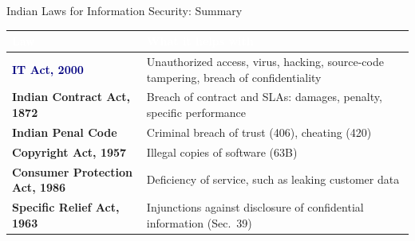 \documentclass[aspectratio=169,11pt,xcolor={table}]{beamer}
\begin{document}
\begin{frame}{Indian Laws for Information Security: Summary}
  \centering
  \renewcommand{\arraystretch}{1.45}
  \small
  \begin{tabular}{>{\bfseries}l >{\raggedright\arraybackslash}p{7.6cm}}
    \toprule
    \rowcolor{navy}\textcolor{white}{Law} & \textcolor{white}{\textbf{What it helps with}}\\
    \midrule
    \textcolor{navy}{IT Act, 2000} & Unauthorized access, virus, hacking, source-code tampering, breach of confidentiality\\
    \textcolor{ocean}{Indian Contract Act, 1872} & Breach of contract and SLAs: damages, penalty, specific performance\\
    \textcolor{grape}{Indian Penal Code} & Criminal breach of trust (406), cheating (420)\\
    \textcolor{amber!80!black}{Copyright Act, 1957} & Illegal copies of software (63B)\\
    \textcolor{leaf!70!black}{Consumer Protection Act, 1986} & Deficiency of service, such as leaking customer data\\
    \textcolor{brick}{Specific Relief Act, 1963} & Injunctions against disclosure of confidential information (Sec.\ 39)\\
    \bottomrule
  \end{tabular}
\end{frame}
\end{document}
